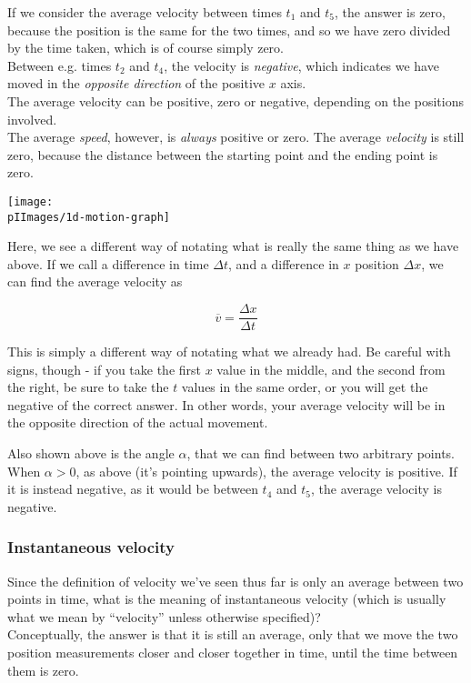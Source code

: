 If we consider the average velocity between times $t_1$ and $t_5$, the answer is zero, because the position is the same for the two times, and so we have zero divided by the time taken, which is of course simply zero.\\
Between e.g. times $t_2$ and $t_4$, the velocity is \emph{negative}, which indicates we have moved in the \emph{opposite direction} of the positive $x$ axis.\\
The average velocity can be positive, zero or negative, depending on the positions involved.\\
The average \emph{speed}, however, is \emph{always} positive or zero. The average \emph{velocity} is still zero, because the distance between the starting point and the ending point is zero.

\begin{center}
\texttt{[image: \\pIImages/1d-motion-graph]}
\end{center}

Here, we see a different way of notating what is really the same thing as we have above. If we call a difference in time $\Delta t$, and a difference in $x$ position $\Delta x$, we can find the average velocity as

\begin{equation}
 \overbar{v} = \frac{\Delta x}{\Delta t}
\end{equation} 

This is simply a different way of notating what we already had. Be careful with signs, though - if you take the first $x$ value in the middle, and the second from the right, be sure to take the $t$ values in the same order, or you will get the negative of the correct answer. In other words, your average velocity will be in the opposite direction of the actual movement.

Also shown above is the angle $\alpha$, that we can find between two arbitrary points. When $\alpha > 0$, as above (it's pointing upwards), the average velocity is positive. If it is instead negative, as it would be between $t_4$ and $t_5$, the average velocity is negative.

\subsubsection{Instantaneous velocity}

Since the definition of velocity we've seen thus far is only an average between two points in time, what is the meaning of instantaneous velocity (which is usually what we mean by ``velocity'' unless otherwise specified)?\\
Conceptually, the answer is that it is still an average, only that we move the two position measurements closer and closer together in time, until the time between them is zero.

